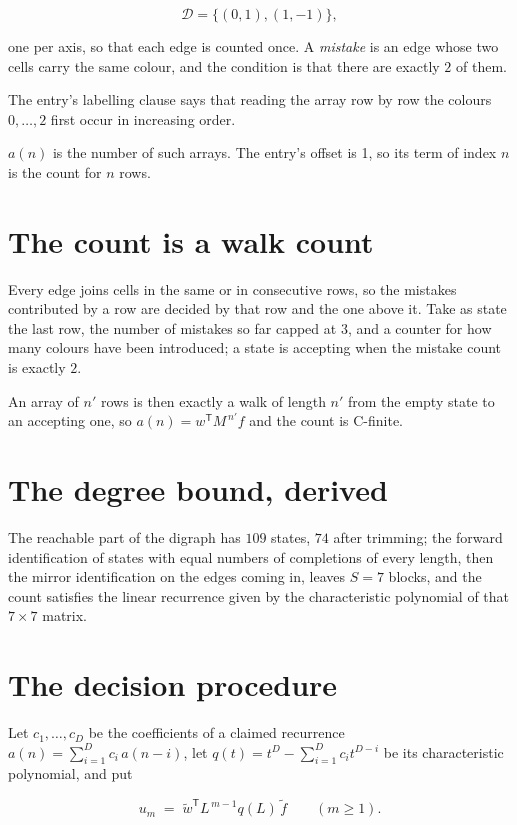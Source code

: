 \documentclass[11pt]{article}
\theoremstyle{definition}
\begin{document}
\[\mathcal{D} = \{(0,1), (1,-1)\},\]

one per axis, so that each edge is counted once. A {\itshape mistake} is an edge whose two cells carry the same colour, and the condition is that there are exactly $2$ of them.

The entry's labelling clause says that reading the array row by row the colours $0,\dots,2$ first occur in increasing order.

$a(n)$ is the number of such arrays. The entry's offset is 1, so its term of index $n$ is the count for $n$ rows.

\section{The count is a walk count}

Every edge joins cells in the same or in consecutive rows, so the mistakes contributed by a row are decided by that row and the one above it. Take as state the last row, the number of mistakes so far capped at $3$, and a counter for how many colours have been introduced; a state is accepting when the mistake count is exactly $2$.

An array of $n'$ rows is then exactly a walk of length $n'$ from the empty state to an accepting one, so $a(n) = w^{\mathsf T}M^{\,n'}f$ and the count is C-finite.

\section{The degree bound, derived}

The reachable part of the digraph has $109$ states, $74$ after trimming; the forward identification of states with equal numbers of completions of every length, then the mirror identification on the edges coming in, leaves $S = 7$ blocks, and the count satisfies the linear recurrence given by the characteristic polynomial of that $7\times7$ matrix.

\section{The decision procedure}

Let $c_1,\dots,c_D$ be the coefficients of a claimed recurrence $a(n) = \sum_{i=1}^{D} c_i\,a(n-i)$, let $q(t) = t^{D} - \sum_{i=1}^{D} c_i t^{D-i}$ be its characteristic polynomial, and put

\[u_m \;=\; \tilde w^{\mathsf T} L^{\,m-1} q(L)\,\tilde f \qquad (m \ge 1).\]
\end{document}
